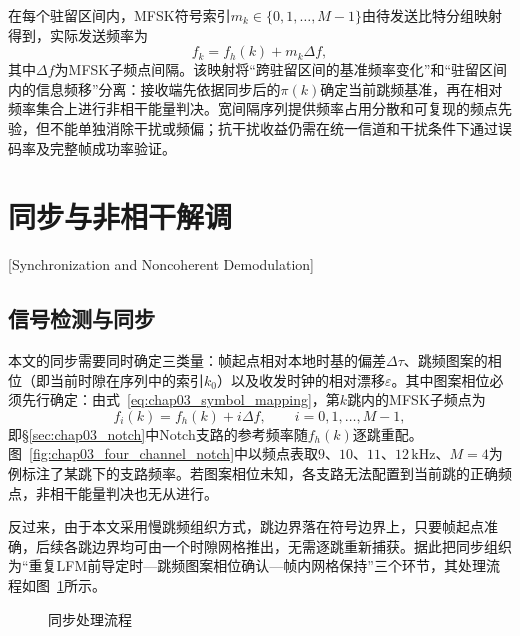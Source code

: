 在每个驻留区间内，MFSK符号索引$m_k\in\{0,1,\ldots,M-1\}$由待发送比特分组映射得到，实际发送频率为
\begin{equation}
 f_k=f_h(k)+m_k\Delta f ,
\label{eq:chap03_symbol_mapping}
\end{equation}
其中$\Delta f$为MFSK子频点间隔。该映射将“跨驻留区间的基准频率变化”和“驻留区间内的信息频移”分离：接收端先依据同步后的$\pi(k)$确定当前跳频基准，再在相对频率集合上进行非相干能量判决。宽间隔序列提供频率占用分散和可复现的频点先验，但不能单独消除干扰或频偏；抗干扰收益仍需在统一信道和干扰条件下通过误码率及完整帧成功率验证。

\section{同步与非相干解调}[Synchronization and Noncoherent Demodulation]
\label{sec:chap03_sync}

\subsection{信号检测与同步}
\label{sec:chap03_detection}

本文的同步需要同时确定三类量：帧起点相对本地时基的偏差$\Delta\tau$、跳频图案的相位（即当前时隙在序列中的索引$k_0$）以及收发时钟的相对漂移$\varepsilon$。其中图案相位必须先行确定：由式~\eqref{eq:chap03_symbol_mapping}，第$k$跳内的MFSK子频点为
\begin{equation}
 f_i(k)=f_h(k)+i\Delta f,\qquad i=0,1,\ldots,M-1,
\label{eq:chap03_branch_freq}
\end{equation}
即\S\ref{sec:chap03_notch}中Notch支路的参考频率随$f_h(k)$逐跳重配。图~\ref{fig:chap03_four_channel_notch}中以频点表取$9$、$10$、$11$、$12\,\mathrm{kHz}$、$M=4$为例标注了某跳下的支路频率。若图案相位未知，各支路无法配置到当前跳的正确频点，非相干能量判决也无从进行。

反过来，由于本文采用慢跳频组织方式，跳边界落在符号边界上，只要帧起点准确，后续各跳边界均可由一个时隙网格推出，无需逐跳重新捕获。据此把同步组织为“重复LFM前导定时—跳频图案相位确认—帧内网格保持”三个环节，其处理流程如图~\ref{fig:chap03_sync_flow}所示。

\begin{figure}[htbp]
 \centering
 \begin{tikzpicture}[x=1cm,y=1cm]
  
 \end{tikzpicture}
 \caption[同步处理流程]{同步处理流程}
 \label{fig:chap03_sync_flow}
\end{figure}

